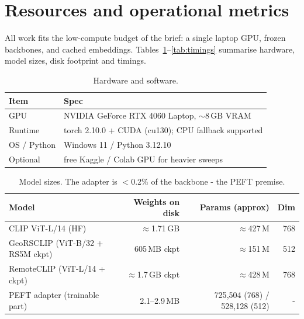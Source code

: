 \documentclass{article}
\begin{document}
\section{Resources and operational metrics}
\label{sec:resources}

All work fits the low-compute budget of the brief: a single laptop GPU, frozen
backbones, and cached embeddings. Tables~\ref{tab:hw}--\ref{tab:timings}
summarise hardware, model sizes, disk footprint and timings.

\begin{table}[H]
    \centering
    \caption{Hardware and software.}
    \label{tab:hw}
    \begin{tabular}{ll}
        \toprule
        \textbf{Item} & \textbf{Spec} \\
        \midrule
        GPU        & NVIDIA GeForce RTX 4060 Laptop, $\sim$8\,GB VRAM \\
        Runtime    & torch 2.10.0 + CUDA (cu130); CPU fallback supported \\
        OS / Python & Windows 11 / Python 3.12.10 \\
        Optional   & free Kaggle / Colab GPU for heavier sweeps \\
        \bottomrule
    \end{tabular}
\end{table}

\begin{table}[H]
    \centering
    \caption{Model sizes. The adapter is $<$0.2\% of the backbone - the PEFT premise.}
    \label{tab:models}
    \setlength{\tabcolsep}{4pt}
    \begin{tabular}{lrrr}
        \toprule
        \textbf{Model} & \textbf{Weights on disk} & \textbf{Params (approx)} & \textbf{Dim} \\
        \midrule
        CLIP ViT-L/14 (HF)                       & $\approx$1.71\,GB & $\approx$427\,M & 768 \\
        GeoRSCLIP (ViT-B/32 + RS5M ckpt)         & 605\,MB ckpt      & $\approx$151\,M & 512 \\
        RemoteCLIP (ViT-L/14 + ckpt)             & $\approx$1.7\,GB ckpt & $\approx$428\,M & 768 \\
        PEFT adapter (trainable part)   & 2.1--2.9\,MB      & 725{,}504 (768) / 528{,}128 (512) & - \\
        \bottomrule
    \end{tabular}
\end{table}
\end{document}
